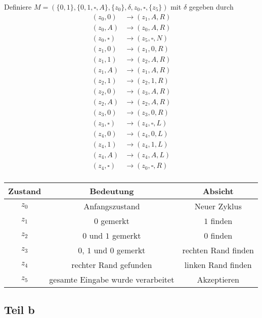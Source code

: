 \documentclass[10pt,a4paper]{article}
\begin{document}
Definiere $M = (\{ 0, 1 \}, \{ 0, 1, \square, A \}, \{ z_{0} \}, \delta, z_{0}, \square, \{ z_{5} \})$ mit $\delta$ gegeben durch
\begin{align*}
  (z_{0}, 0) & \rightarrow (z_{1}, A, R)\\
  (z_{0}, A) & \rightarrow (z_{0}, A, R)\\
  (z_{0}, \square) & \rightarrow (z_{5}, \square, N)\\
  (z_{1}, 0) & \rightarrow (z_{1}, 0, R)\\
  (z_{1}, 1) & \rightarrow (z_{2}, A, R)\\
  (z_{1}, A) & \rightarrow (z_{1}, A, R)\\
  (z_{2}, 1) & \rightarrow (z_{2}, 1, R)\\
  (z_{2}, 0) & \rightarrow (z_{3}, A, R)\\
  (z_{2}, A) & \rightarrow (z_{2}, A, R)\\
  (z_{3}, 0) & \rightarrow (z_{3}, 0, R)\\
  (z_{3}, \square) & \rightarrow (z_{4}, \square, L)\\
  (z_{4}, 0) & \rightarrow (z_{4}, 0, L)\\
  (z_{4}, 1) & \rightarrow (z_{4}, 1, L)\\
  (z_{4}, A) & \rightarrow (z_{4}, A, L)\\
  (z_{4}, \square) & \rightarrow (z_{0}, \square, R)\\
\end{align*}

\begin{tabular}{c|c|c}
  Zustand & Bedeutung & Absicht\\\hline
  $z_{0}$ & Anfangszustand & Neuer Zyklus\\\hline
  $z_{1}$ & $0$ gemerkt & $1$ finden\\\hline
  $z_{2}$ & $0$ und $1$ gemerkt & $0$ finden\\\hline
  $z_{3}$ & $0$, $1$ und $0$ gemerkt & rechten Rand finden\\\hline
  $z_{4}$ & rechter Rand gefunden & linken Rand finden\\\hline
  $z_{5}$ & gesamte Eingabe wurde verarbeitet & Akzeptieren
\end{tabular}

\subsection{Teil b}
\end{document}
